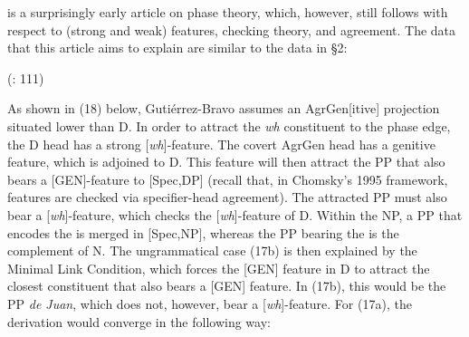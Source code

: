 \documentclass[output=paper]{langsci/langscibook}
\begin{document}
\citet{Gutiérrez-Bravo2001} is a surprisingly early article on phase theory, which, however, still follows \citet{Chomsky1995} with respect to (strong and weak) features, checking theory, and agreement. The  data that this article aims to explain are similar to the  data in §2:

\ea%
 (\citealt{Gutiérrez-Bravo2001}: 111)\label{ex:mensch:17}\\
    \z
\z

As shown in (18) below, Gutiérrez-Bravo assumes an AgrGen[itive] projection situated lower than D. In order to attract the \textit{wh} constituent to the phase edge, the D head has a strong [\textit{wh}]-feature. The covert AgrGen head has a genitive feature, which is adjoined to D. This feature will then attract the PP that also bears a [GEN]-feature to [Spec,DP] (recall that, in Chomsky’s 1995 framework, features are checked via specifier-head agreement). The attracted PP must also bear a [\textit{wh}]-feature, which checks the [\textit{wh}]-feature of D. Within the NP, a PP that encodes the \AGENT is merged in [Spec,NP], whereas the PP bearing the \THEME {} is the complement of N. The ungrammatical case (17b) is then explained by the Minimal Link Condition, which forces the [GEN] feature in D to attract the closest constituent that also bears a [GEN] feature. In (17b), this would be the PP \textit{de Juan}, which does not, however, bear a [\textit{wh}]-feature. For (17a), the derivation would converge in the following way:
\end{document}
